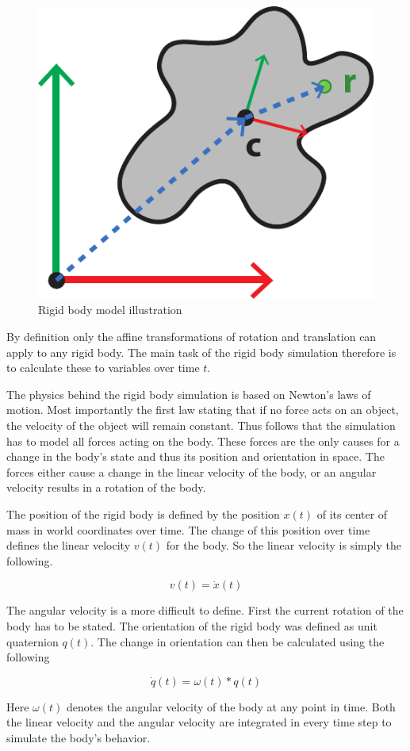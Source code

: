 \begin{figure}[htb]
\centering
\includegraphics[width=.4\textwidth]{images/rigid_body_1.pdf}
\caption{Rigid body model illustration}
\label{img:rigid_body}
\end{figure}

By definition only the affine transformations of rotation and translation can apply to any rigid body. The main task of the rigid body simulation therefore is to calculate these to variables over time \(t\).

The physics behind the rigid body simulation is based on Newton's laws of motion. Most importantly the first law stating that if no force acts on an object, the velocity of the object will remain constant. Thus follows that the simulation has to model all forces acting on the body. These forces are the only causes for a change in the body's state and thus its position and orientation in space. The forces either cause a change in the linear velocity of the body, or an angular velocity results in a rotation of the body. 

The position of the rigid body is defined by the position $x(t)$ of its center of mass in world coordinates over time. The change of this position over time defines the linear velocity $v(t)$ for the body. So the linear velocity is simply the following.

\begin{equation}
v(t) = \dot{x}(t)
\end{equation}

The angular velocity is a more difficult to define. First the current rotation of the body has to be stated. The orientation of the rigid body was defined as unit quaternion $q(t)$. The change in orientation can then be calculated using the following

\begin{equation}
\dot{q}(t) = \omega(t) * q(t)
\end{equation}

Here $\omega(t)$ denotes the angular velocity of the body at any point in time. Both the linear velocity and the angular velocity are integrated in every time step to simulate the body's behavior.

